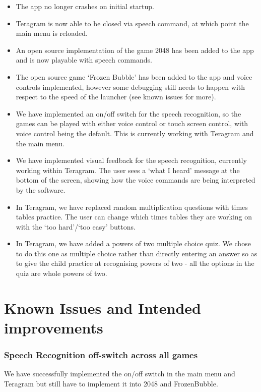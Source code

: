 \documentclass[11pt, oneside]{article}
\begin{document}
\begin{itemize}
	\item The app no longer crashes on initial startup.
	\item Teragram is now able to be closed via speech command, at
          which point the main menu is reloaded.
	\item An open source implementation of the game 2048 has been
          added to the app and is now playable with speech commands.
	\item The open source game `Frozen Bubble' has been added to
          the app and voice controls implemented, however some
          debugging still needs to happen with respect to the speed of
          the launcher (see known issues for more).
        \item We have implemented an on/off switch for the speech
          recognition, so the games can be played with either voice
          control or touch screen control, with voice control being
          the default. This is currently working with Teragram and the
          main menu.
        \item We have implemented visual feedback for the speech
          recognition, currently working within Teragram. The user
          sees a `what I heard' message at the bottom of the screen,
          showing how the voice commands are being interpreted by the
          software.
        \item In Teragram, we have replaced random multiplication
          questions with times tables practice. The user can change
          which times tables they are working on with the `too
          hard'/`too easy' buttons.
        \item In Teragram, we have added a powers of two multiple
          choice quiz. We chose to do this one as multiple choice
          rather than directly entering an answer so as to give the
          child practice at recognising powers of two - all the
          options in the quiz are whole powers of two.
\end{itemize}

\pagebreak

\section{Known Issues and Intended improvements}

\subsubsection*{Speech Recognition off-switch across all games}
We have successfully implemented the on/off switch in the main menu and 
Teragram but still have to implement it into 2048 and FrozenBubble.
\end{document}
